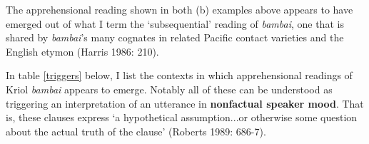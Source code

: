 \documentclass[12pt]{article}
\newcommand{\hk}[1]
 {\marginpar{\color{purple}\raggedleft\raggedright\hspace{0pt}\linespread{0.8}\footnotesize{#1}}}
\renewcommand{\hk}[1]{}
\begin{document}
The apprehensional reading shown in both (b) examples above appears to have emerged out of what I term the `subsequential' reading of \textit{bambai}, one that is shared by \textit{bambai}'s many cognates in related Pacific contact varieties and the English etymon (Harris 1986: 210).\hk{provide an example of this from another PCV}

In table \ref{triggers} below, I list the contexts in which apprehensional readings of Kriol \textit{bambai} appears to emerge. Notably all of these can be understood as triggering an interpretation of an utterance in \textbf{nonfactual speaker mood}. That is, these clauses express `a hypothetical assumption...or otherwise some question about the actual truth of the clause' (Roberts 1989: 686-7).

\end{document}
